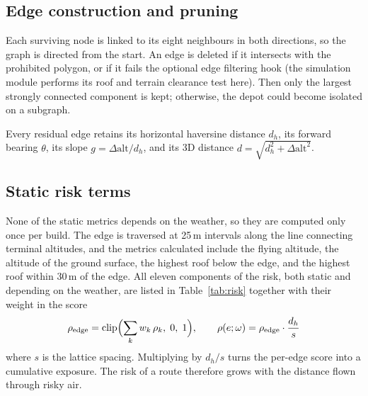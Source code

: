\subsection{Edge construction and pruning}

Each surviving node is linked to its eight neighbours in both directions, so the graph
is directed from the start. An edge is deleted if it intersects
with the prohibited polygon, or if it fails the optional edge filtering hook (the simulation module performs its roof and terrain clearance test here). Then only the largest strongly connected component is kept; otherwise, the depot could become isolated on a subgraph.

Every residual edge retains its horizontal haversine distance $d_h$, its forward bearing
$\theta$, its slope $g = \Delta\mathrm{alt}/d_h$, and its 3D distance
$d = \sqrt{d_h^2 + \Delta\mathrm{alt}^2}$.

\subsection{Static risk terms}

None of the static metrics depends on the weather, so they are computed
only once per build. The edge is traversed at 25\,m intervals along the line connecting
terminal altitudes, and the metrics calculated include the flying altitude, the altitude
of the ground surface, the highest roof below the edge, and the highest roof within
30\,m of the edge. All eleven components of the risk, both static and depending on the
weather, are listed in Table~\ref{tab:risk} together with their weight in the score
\begin{equation}
  \rho_\mathrm{edge} = \operatorname{clip}\Bigl(\sum_k w_k\,\rho_k,\; 0,\; 1\Bigr),
  \qquad \rho(e;\omega) = \rho_\mathrm{edge}\cdot\frac{d_h}{s} \label{eq:risk}
\end{equation}
where $s$ is the lattice spacing. Multiplying by $d_h/s$ turns the per-edge score into
a cumulative exposure. The risk of a route therefore grows with the distance flown
through risky air.

